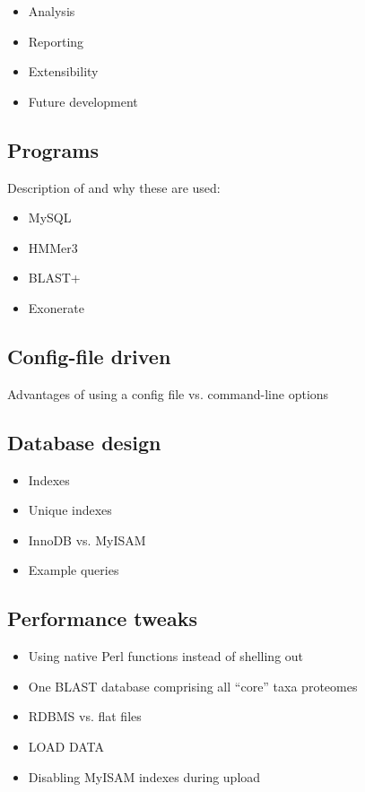 \documentclass[a4paper]{scrartcl}
\begin{document}
\begin{itemize}
	\item Analysis
	\item Reporting
	\item Extensibility
	\item Future development
\end{itemize}

\subsection{Programs}

Description of and why these are used:

\begin{itemize}
	\item MySQL
	\item HMMer3
	\item BLAST+
	\item Exonerate
\end{itemize}

\subsection{Config-file driven}

Advantages of using a config file vs. command-line options

\subsection{Database design}

\begin{itemize}
	\item Indexes
	\item Unique indexes
	\item InnoDB vs. MyISAM
	\item Example queries
\end{itemize}

\subsection{Performance tweaks}

\begin{itemize}
	\item Using native Perl functions instead of shelling out
	\item One BLAST database comprising all ``core'' taxa proteomes
	\item RDBMS vs. flat files
	\item LOAD DATA 
	\item Disabling MyISAM indexes during upload
\end{itemize}
\end{document}
